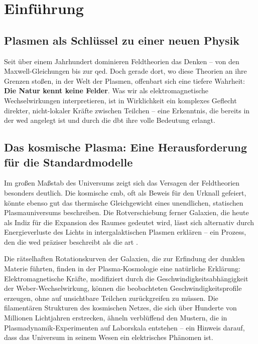 \chapter{Einführung}
\section{Plasmen als Schlüssel zu einer neuen Physik}
Seit über einem Jahrhundert dominieren Feldtheorien das Denken – von den Maxwell-Gleichungen bis zur \gls{qed}. Doch gerade dort, wo diese Theorien an ihre Grenzen stoßen, in der
Welt der Plasmen, offenbart sich eine tiefere Wahrheit: \textbf{Die Natur kennt keine Felder}. Was wir als elektromagnetische Wechselwirkungen interpretieren, ist in Wirklichkeit ein
komplexes Geflecht direkter, nicht-lokaler Kräfte zwischen Teilchen – eine Erkenntnis, die bereits in der \gls{wed} \cite{Weber1846} angelegt ist und durch die \gls{dbt} \cite{bohm1952}
ihre volle Bedeutung erlangt.

\section{Das kosmische Plasma: Eine Herausforderung für die Standardmodelle}
Im großen Maßstab des Universums zeigt sich das Versagen der Feldtheorien besonders deutlich. Die kosmische \gls{cmb}, oft als Beweis für den Urknall gefeiert, könnte
ebenso gut das thermische Gleichgewicht eines unendlichen, statischen Plasmauniversums beschreiben. Die Rotverschiebung ferner Galaxien, die heute als Indiz für die Expansion des
Raumes gedeutet wird, lässt sich alternativ durch Energieverluste des Lichts in intergalaktischen Plasmen erklären – ein Prozess, den die \gls{wed} präziser beschreibt
als die \gls{art} \cite{einstein1915}.

Die rätselhaften Rotationskurven der Galaxien, die zur Erfindung der dunklen Materie führten, finden in der Plasma-Kosmologie eine natürliche Erklärung: Elektromagnetische Kräfte,
modifiziert durch die Geschwindigkeitsabhängigkeit der Weber-Wechselwirkung, können die beobachteten Geschwindigkeitsprofile erzeugen, ohne auf unsichtbare Teilchen zurückgreifen
zu müssen. Die filamentären Strukturen des kosmischen Netzes, die sich über Hunderte von Millionen Lichtjahren erstrecken, ähneln verblüffend den Mustern, die in
Plasmadynamik-Experimenten auf Laborskala entstehen – ein Hinweis darauf, dass das Universum in seinem Wesen ein elektrisches Phänomen ist.

